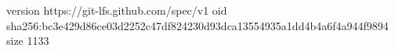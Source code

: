 version https://git-lfs.github.com/spec/v1
oid sha256:bc3e429d86ce03d2252c47df824230d93dca13554935a1dd4b4a6f4a944f9894
size 1133
